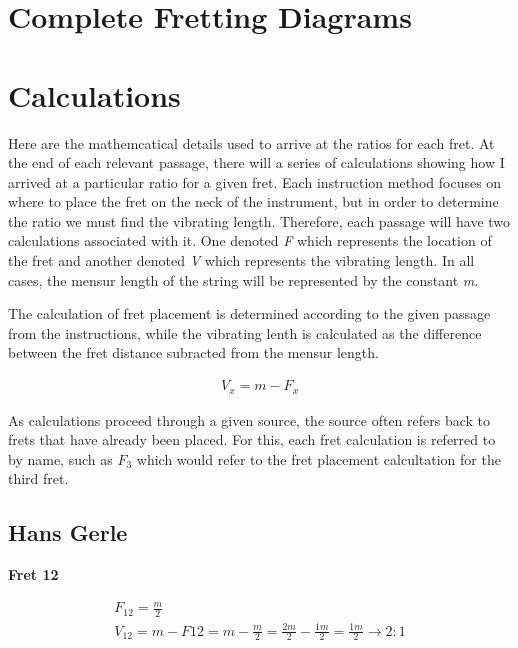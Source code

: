 \appendix

\chapter{Complete Fretting Diagrams}





\chapter{Calculations}

Here are the mathemcatical details used to arrive at the ratios for each fret.  At the end of
each relevant passage, there will a series of calculations showing how I arrived at a particular
ratio for a given fret.  Each instruction method focuses on where to place the fret on the neck
of the instrument, but in order to determine the ratio we must find the vibrating length.
Therefore, each passage will have two calculations associated with it.  One denoted \textit{F}
which represents the location of the fret and another denoted \textit{V} which represents the
vibrating length.  In all cases, the mensur length of the string will be represented by the
constant \textit{m}.

The calculation of fret placement is determined according to the given passage from the
instructions, while the vibrating lenth is calculated as the difference between the fret distance
subracted from the mensur length.

\begin{eqnarray*}
    V_x = m - F_x
\end{eqnarray*}

As calculations proceed through a given source, the source often refers back to frets that have
already been placed.  For this, each fret calculation is referred to by name, such as
$F_{3}$ which would refer to the fret placement calcultation for the third fret.

\section{Hans Gerle}

\textbf{Fret 12}

\begin{eqnarray*}
F_{12} =
    \frac{m}{2} \\
V_{12} =
    m - F{12} =
    m - \frac{m}{2} =
    \frac{2m}{2} - \frac{1m}{2} =
    \frac{1m}{2}
    \to 2:1
\end{eqnarray*}

